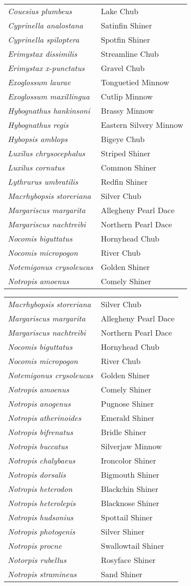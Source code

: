 \documentclass[11pt]{article}
\begin{document}
%
\textbf{\Student}

\begin{tabular}{@{}L{3in}L{3in}@{}}
\textit{Couesius plumbeus} & Lake Chub\tabularnewline
\textit{Cyprinella analostana} & Satinfin Shiner\tabularnewline
\textit{Cyprinella spiloptera} & Spotfin Shiner\tabularnewline
\textit{Erimystax dissimilis} & Streamline Chub\tabularnewline
\textit{Erimystax x-punctatus} & Gravel Chub\tabularnewline
\textit{Exoglossum laurae} & Tonguetied Minnow\tabularnewline
\textit{Exoglossum maxillingua} & Cutlip Minnow\tabularnewline
\textit{Hybognathus hankinsoni} & Brassy Minnow\tabularnewline
\textit{Hybognathus regis} & Eastern Silvery Minnow\tabularnewline
\textit{Hybopsis amblops} & Bigeye Chub\tabularnewline
\textit{Luxilus chrysocephalus} & Striped Shiner\tabularnewline
\textit{Luxilus cornutus} & Common Shiner\tabularnewline
\textit{Lythrurus umbratilis} & Redfin Shiner\tabularnewline
\textit{Macrhybopsis storeriana} & Silver Chub\tabularnewline
\textit{Margariscus margarita} & Allegheny Pearl Dace\tabularnewline
\textit{Margariscus nachtreibi} & Northern Pearl Dace\tabularnewline
\textit{Nocomis biguttatus} & Hornyhead Chub\tabularnewline
\textit{Nocomis micropogon} & River Chub\tabularnewline
\textit{Notemigonus crysoleucas} & Golden Shiner\tabularnewline
\textit{Notropis amoenus} & Comely Shiner\tabularnewline
\end{tabular}

\newpage

\vspace{\baselineskip}

%
\textbf{\Student}

\begin{tabular}{@{}L{3in}L{3in}@{}}
\textit{Macrhybopsis storeriana} & Silver Chub\tabularnewline
\textit{Margariscus margarita} & Allegheny Pearl Dace\tabularnewline
\textit{Margariscus nachtreibi} & Northern Pearl Dace\tabularnewline
\textit{Nocomis biguttatus} & Hornyhead Chub\tabularnewline
\textit{Nocomis micropogon} & River Chub\tabularnewline
\textit{Notemigonus crysoleucas} & Golden Shiner\tabularnewline
\textit{Notropis amoenus} & Comely Shiner\tabularnewline
\textit{Notropis anogenus} & Pugnose Shiner\tabularnewline
\textit{Notropis atherinoides} & Emerald Shiner\tabularnewline
\textit{Notropis bifrenatus} & Bridle Shiner\tabularnewline
\textit{Notropis buccatus} & Silverjaw Minnow\tabularnewline
\textit{Notropis chalybaeus} & Ironcolor Shiner\tabularnewline
\textit{Notropis dorsalis} & Bigmouth Shiner\tabularnewline
\textit{Notropis heterodon} & Blackchin Shiner\tabularnewline
\textit{Notropis heterolepis} & Blacknose Shiner\tabularnewline
\textit{Notropis hudsonius} & Spottail Shiner\tabularnewline
\textit{Notropis photogenis} & Silver Shiner\tabularnewline
\textit{Notropis procne} & Swallowtail Shiner\tabularnewline
\textit{Notorpis rubellus} & Rosyface Shiner\tabularnewline
\textit{Notropis stramineus} & Sand Shiner\tabularnewline
\end{tabular}
\end{document}
